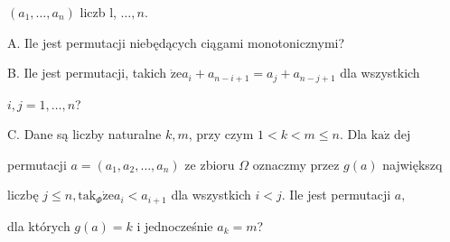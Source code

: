 \documentclass[a4paper,12pt]{article}
\begin{document}
$(a_{1},\ldots,a_{n})$ liczb l, $\ldots, n.$

A. Ile jest permutacji niebędących ciągami monotonicznymi?

B. Ile jest permutacji, takich $\dot{\mathrm{z}}\mathrm{e}a_{i}+a_{n-i+1} =a_{j}+a_{n-j+1}$ dla wszystkich

$i, j=1, \ldots, n$?

C. Dane są liczby naturalne $k, m$, przy czym $1 <k<m\leq n$. Dla $\mathrm{k}\mathrm{a}\dot{\mathrm{z}}$ dej

permutacji $a=(a_{1},a_{2},\ldots,a_{n})$ ze zbioru $\Omega$ oznaczmy przez $g(a)$ największq

liczbę $j\leq n, \mathrm{t}\mathrm{a}\mathrm{k}_{\Phi}\dot{\mathrm{z}}\mathrm{e}a_{i}<a_{i+1}$ dla wszystkich $i<j$. Ile jest permutacji $a,$

dla których $g(a)=k$ i jednocześnie $a_{k}=m$?
\end{document}
